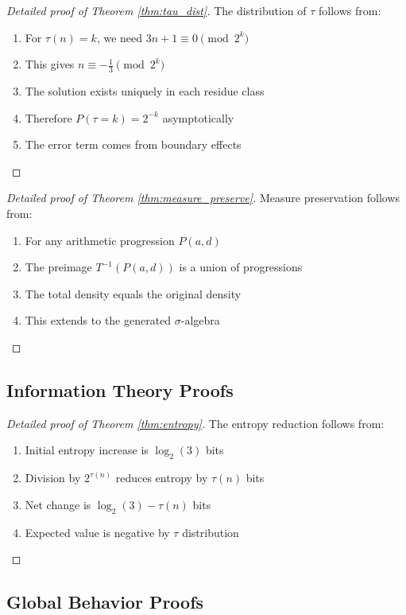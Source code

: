 \begin{proof}[Detailed proof of Theorem \ref{thm:tau_dist}]
The distribution of $\tau$ follows from:
\begin{enumerate}
\item For $\tau(n) = k$, we need $3n + 1 \equiv 0 \pmod{2^k}$
\item This gives $n \equiv -\frac{1}{3} \pmod{2^k}$
\item The solution exists uniquely in each residue class
\item Therefore $P(\tau = k) = 2^{-k}$ asymptotically
\item The error term comes from boundary effects
\end{enumerate}
\end{proof}

\begin{proof}[Detailed proof of Theorem \ref{thm:measure_preserve}]
Measure preservation follows from:
\begin{enumerate}
\item For any arithmetic progression $P(a,d)$
\item The preimage $T^{-1}(P(a,d))$ is a union of progressions
\item The total density equals the original density
\item This extends to the generated $\sigma$-algebra
\end{enumerate}
\end{proof}

\subsection{Information Theory Proofs}

\begin{proof}[Detailed proof of Theorem \ref{thm:entropy}]
The entropy reduction follows from:
\begin{enumerate}
\item Initial entropy increase is $\log_2(3)$ bits
\item Division by $2^{\tau(n)}$ reduces entropy by $\tau(n)$ bits
\item Net change is $\log_2(3) - \tau(n)$ bits
\item Expected value is negative by $\tau$ distribution
\end{enumerate}
\end{proof}

\subsection{Global Behavior Proofs}

